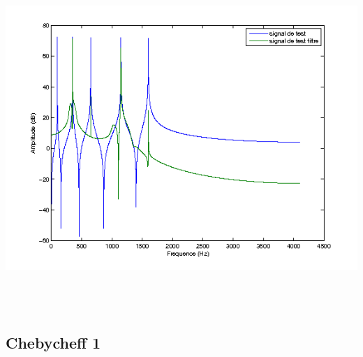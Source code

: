 \documentclass{article}
\begin{document}
\includegraphics[height=13cm]{butt_3}

\subsection{Chebycheff 1}
\end{document}
